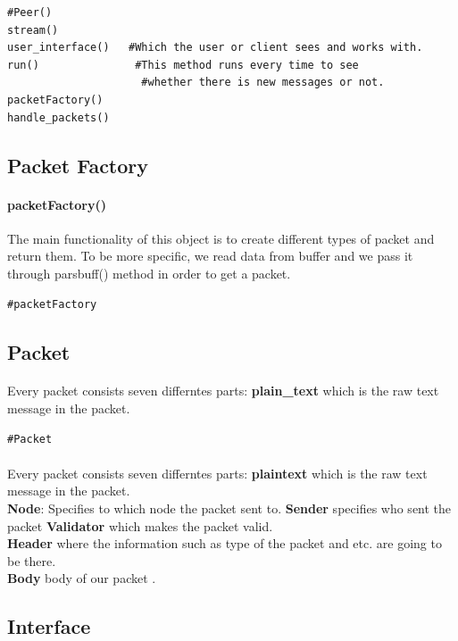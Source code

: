 \documentclass{article}
\begin{document}
\begin{lstlisting}
#Peer()
stream()
user_interface()   #Which the user or client sees and works with. 
run() 				#This method runs every time to see 
				     #whether there is new messages or not.
packetFactory()
handle_packets()
\end{lstlisting}
\subsection{Packet Factory}
\paragraph{packetFactory()}The main functionality of this object is to create different types of packet and return them. To be more specific, we read data from buffer and we pass it through pars\underline{\hspace{.05in}}buff() method in order to get a packet.
\begin{lstlisting}
#packetFactory
\end{lstlisting}
\subsection{Packet}

\paragraph{}Every packet consists seven differntes parts: \textbf{plain\_text} which is the raw text message in the packet.\\
\begin{lstlisting}
#Packet

\end{lstlisting}
\paragraph{}Every packet consists seven differntes parts: \textbf{plain\underline{\hspace{.05in}}text} which is the raw text message in the packet.\\
\textbf{Node}: Specifies to which node the packet sent to. \textbf{Sender} specifies who sent the packet \textbf{Validator} which makes the packet valid.\\ \textbf{Header} where the information such as type of the packet and etc. are going to be there.\\ \textbf{Body} body of our packet .
\subsection{Interface}
\end{document}

